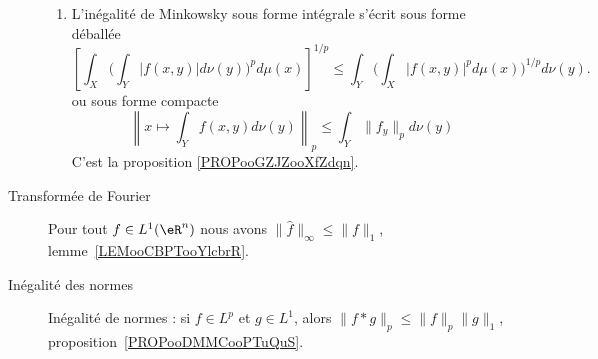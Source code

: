 \begin{description}
\begin{enumerate}
		      \item
		            L'inégalité de Minkowsky sous forme intégrale s'écrit sous forme déballée
		            \begin{equation*}
			            \left[ \int_X\Big( \int_Y| f(x,y) |d\nu(y) \Big)^pd\mu(x) \right]^{1/p}\leq \int_Y\Big( \int_X| f(x,y) |^pd\mu(x) \Big)^{1/p}d\nu(y).
		            \end{equation*}
		            ou sous forme compacte
		            \begin{equation*}
			            \left\|   x\mapsto\int_Y f(x,y)d\nu(y)   \right\|_p\leq \int_Y  \| f_y \|_pd\nu(y)
		            \end{equation*}
		            C'est la proposition \ref{PROPooGZJZooXfZdqn}.
	      \end{enumerate}
	\item[Transformée de Fourier]
	      Pour tout \( f\in L^1(\eR^n)\) nous avons \( \| \hat f \|_{\infty}\leq \| f \|_1\), lemme~\ref{LEMooCBPTooYlcbrR}.
	\item[Inégalité des normes]
	      Inégalité de normes : si \( f\in L^p\) et \( g\in L^1\), alors \( \| f*g \|_p\leq \| f \|_p\| g \|_1\), proposition~\ref{PROPooDMMCooPTuQuS}.

\end{description}
